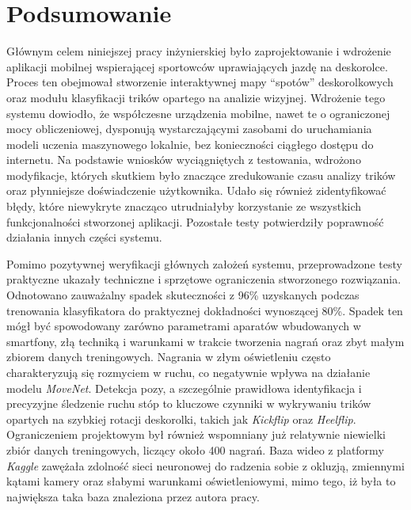 \newpage
\section{Podsumowanie}

    Głównym celem niniejszej pracy inżynierskiej było zaprojektowanie i wdrożenie aplikacji mobilnej wspierającej sportowców uprawiających jazdę na deskorolce. Proces ten obejmował stworzenie interaktywnej mapy \enquote{spotów} deskorolkowych oraz modułu klasyfikacji trików opartego na analizie wizyjnej. Wdrożenie tego systemu dowiodło, że współczesne urządzenia mobilne, nawet te o ograniczonej mocy obliczeniowej, dysponują wystarczającymi zasobami do uruchamiania modeli uczenia maszynowego lokalnie, bez konieczności ciągłego dostępu do internetu. Na podstawie wniosków wyciągniętych z testowania, wdrożono modyfikacje, których skutkiem było znaczące zredukowanie czasu analizy trików oraz płynniejsze doświadczenie użytkownika. Udało się również zidentyfikować błędy, które niewykryte znacząco utrudniałyby korzystanie ze wszystkich funkcjonalności stworzonej aplikacji. Pozostałe testy potwierdziły poprawność działania innych części systemu.

    Pomimo pozytywnej weryfikacji głównych założeń systemu, przeprowadzone testy praktyczne ukazały techniczne i sprzętowe ograniczenia stworzonego rozwiązania. Odnotowano zauważalny spadek skuteczności z 96\% uzyskanych podczas trenowania klasyfikatora do praktycznej dokładności wynoszącej 80\%. Spadek ten mógł być spowodowany zarówno parametrami aparatów wbudowanych w smartfony, złą techniką i warunkami w trakcie tworzenia nagrań oraz zbyt małym zbiorem danych treningowych. Nagrania w złym oświetleniu często charakteryzują się rozmyciem w ruchu, co negatywnie wpływa na działanie modelu \textit{MoveNet}. Detekcja pozy, a szczególnie prawidłowa identyfikacja i precyzyjne śledzenie ruchu stóp to kluczowe czynniki w wykrywaniu trików opartych na szybkiej rotacji deskorolki, takich jak \textit{Kickflip} oraz \textit{Heelflip}. Ograniczeniem projektowym był również wspomniany już relatywnie niewielki zbiór danych treningowych, liczący około 400 nagrań. Baza wideo z platformy \textit{Kaggle} zawężała zdolność sieci neuronowej do radzenia sobie z okluzją, zmiennymi kątami kamery oraz słabymi warunkami oświetleniowymi, mimo tego, iż była to największa taka baza znaleziona przez autora pracy.
    
